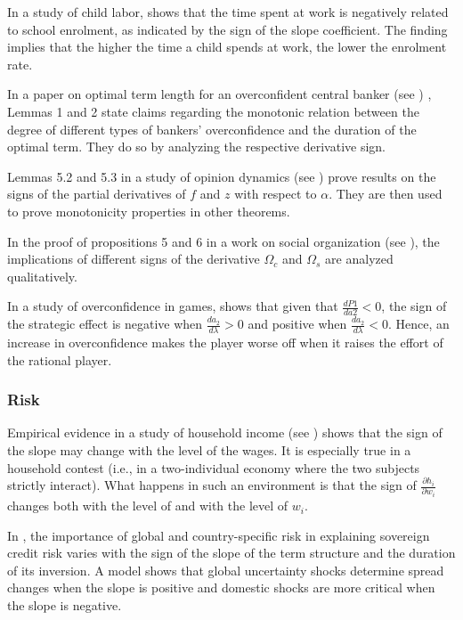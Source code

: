 \documentclass[11pt]{book}
\begin{document}
In a study of child labor, \cite{nwogwugwu2017impact} shows that the time spent
at work is negatively related to school enrolment, as indicated by
the sign of the slope coefficient. The finding implies that the higher the
time a child spends at work, the lower the enrolment rate.

In a paper on optimal term length for an overconfident
central banker (see \cite{farvaque2017optimal}) , Lemmas 1 and 2 state claims regarding
the monotonic relation between the degree of different types of bankers'
overconfidence and the duration of the optimal term. They do so by
analyzing the respective derivative sign.

Lemmas 5.2 and 5.3 in a study of opinion dynamics (see \cite{abebe2020opinion}) prove results on the
signs of the partial derivatives of $f$ and $z$ with respect to
$\alpha$. They are then used to prove monotonicity properties in
other theorems.

In the proof of propositions 5 and 6 in a work on social organization (see \cite{marcoasocial}), the
implications of different signs of the derivative $\Omega_{c}$ and
$\Omega_{s}$ are analyzed qualitatively.

In a study of overconfidence in games, \cite{santos2021overconfident} shows that given that $\frac{dP1}{da2}<0$,
the sign of the strategic effect is negative when $\frac{da_{2}}{d\lambda}>0$
and positive when $\frac{da_{2}}{d\lambda}<0$. Hence, an increase
in overconfidence makes the player worse off when it raises the effort
of the rational player.


\subsubsection{Risk}

Empirical evidence in a study of household income (see \cite{mariotti2016job}) shows that the sign
of the slope may change with the level of the wages. It is especially
true in a household contest (i.e., in a two-individual economy where
the two subjects strictly interact). What happens in such an environment
is that the sign of $\frac{\partial h_{i}}{\partial w_{i}}$ changes
both with the level of and with the level of $w_{i}$.

In \cite{augustin2018term}, the importance of global and country-specific
risk in explaining sovereign credit risk varies with the sign of the
slope of the term structure and the duration of its inversion. A model
shows that global uncertainty shocks determine spread changes when
the slope is positive and domestic shocks are more critical when
the slope is negative.
\end{document}
